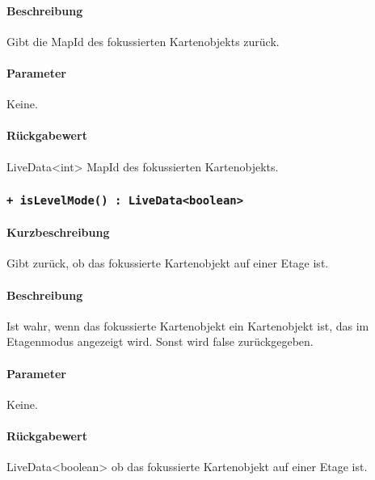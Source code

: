 \paragraph*{Beschreibung}
Gibt die MapId des fokussierten Kartenobjekts zurück.
\paragraph*{Parameter}
Keine.
\paragraph*{Rückgabewert}
LiveData<int> MapId des fokussierten Kartenobjekts.

\subsubsection{\texttt{+ isLevelMode() : LiveData<boolean>}}%
\paragraph*{Kurzbeschreibung}
Gibt zurück, ob das fokussierte Kartenobjekt auf einer Etage ist.
\paragraph*{Beschreibung}
Ist wahr, wenn das fokussierte Kartenobjekt ein Kartenobjekt ist, das im Etagenmodus 
angezeigt wird. Sonst wird false zurückgegeben.
\paragraph*{Parameter}
Keine.
\paragraph*{Rückgabewert}
LiveData<boolean> ob das fokussierte Kartenobjekt auf einer Etage ist.